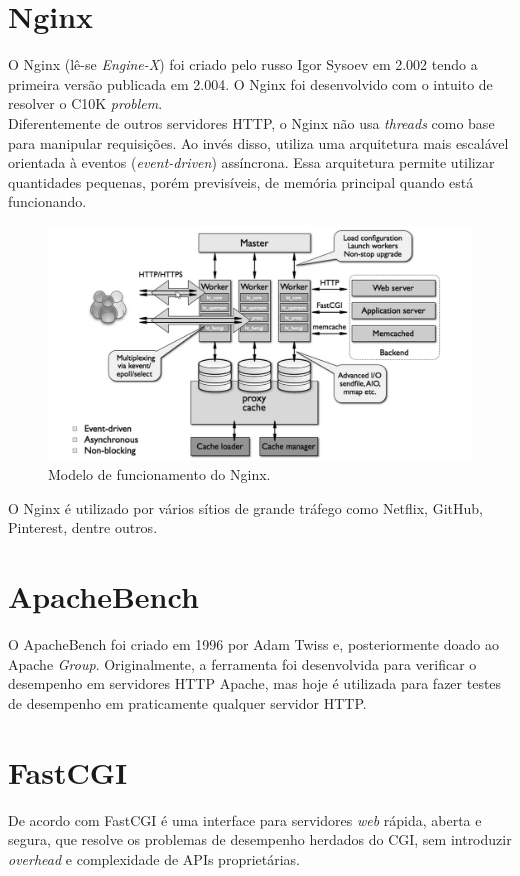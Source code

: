 \section{Nginx}
O Nginx (lê-se \textit{Engine-X}) foi criado pelo russo Igor Sysoev em 2.002 
tendo a primeira versão publicada em 2.004. O Nginx foi desenvolvido com o 
intuito de resolver o C10K \textit{problem}.\\
Diferentemente de outros servidores HTTP, o Nginx não usa \textit{threads} como 
base para manipular requisições. Ao invés disso, utiliza uma arquitetura mais 
escalável orientada à eventos (\textit{event-driven}) assíncrona. Essa 
arquitetura permite utilizar quantidades pequenas, porém previsíveis, de 
memória principal quando está funcionando.\\
\begin{figure}[h!]
\centering
\includegraphics[scale=1]{figuras/nginx-how-it-works} 
\caption{Modelo de funcionamento do Nginx.}
\label{fig:nginx-comofunciona}
\end{figure}
O Nginx é utilizado por vários sítios de grande tráfego como Netflix, GitHub, 
Pinterest, dentre outros.\\
\section{ApacheBench}
O ApacheBench foi criado em 1996 por Adam Twiss e, posteriormente doado ao 
Apache \textit{Group}. Originalmente, a ferramenta foi desenvolvida para 
verificar o desempenho em servidores HTTP Apache, mas hoje é utilizada para 
fazer testes de desempenho em  praticamente qualquer servidor HTTP.
\section{FastCGI}
De acordo com  FastCGI é uma interface para servidores 
\textit{web} rápida, aberta e segura, que resolve os problemas de desempenho 
herdados do CGI, sem introduzir \textit{overhead} e complexidade de APIs 
proprietárias.
